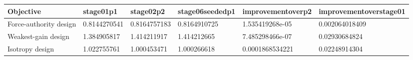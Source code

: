 \begin{tabular}{@{}llllll@{}}
\toprule
Objective & stage01p1 & stage02p2 & stage06seededp1 & improvementoverp2 & improvementoverstage01 \\
\midrule
Force-authority design & 0.8144270541 & 0.8164757183 & 0.8164910725 & 1.535419268e-05 & 0.002064018409 \\
Weakest-gain design & 1.384905817 & 1.414211917 & 1.414212665 & 7.485298466e-07 & 0.02930684824 \\
Isotropy design & 1.022755761 & 1.000453471 & 1.000266618 & 0.0001868534221 & 0.02248914304 \\
\bottomrule
\end{tabular}
